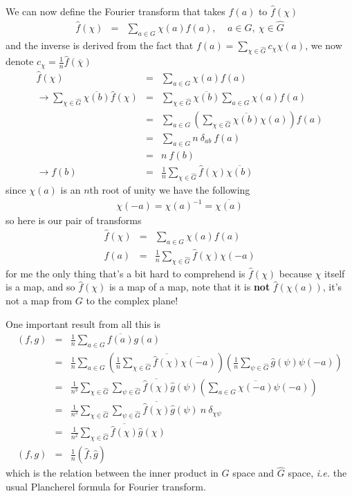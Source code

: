 \documentclass[aps,preprint,preprintnumbers,nofootinbib,showpacs,prd]{revtex4-1}
\newcommand{\ie}{{\it i.e.} }
\newcommand{\nbea}{\begin{eqnarray*}}
\newcommand{\neea}{\end{eqnarray*}}
\begin{document}
We can now define the Fourier transform that takes $f(a)$ to $\widehat f(\chi)$
%
\nbea
\widehat f (\chi) & = & \sum_{a\in G}\chi(a)f(a), ~~~~~ a\in G, ~ \chi\in \widehat G
\neea
%
and the inverse is derived from the fact that $f(a) = \sum_{\chi \in \widehat G} c_\chi \chi(a)$, we now denote $c_\chi = \frac{1}{n} \widehat f(\overline \chi)$
%
\nbea
\widehat f (\chi) & = & \sum_{a\in G}\chi(a)f(a) \\
\to \sum_{\chi \in \widehat G} \overline{\chi(b)} \widehat f (\chi)  & = & \sum_{\chi \in \widehat G} \overline{\chi(b)} \sum_{a\in G}\chi(a)f(a) \\
& = & \sum_{a\in G} \left (\sum_{\chi \in \widehat G} \overline{\chi(b)} \chi(a) \right ) f(a) \\
& = & \sum_{a\in G} n ~\delta_{ab}~ f(a) \\
& = & n~f(b) \\
\to f(b) & = & \frac{1}{n} \sum_{\chi \in \widehat G} \widehat f (\chi) \overline{\chi(b)}
\neea
%
since $\chi(a)$ is an $n$th root of unity we have the following
%
\nbea
\chi(-a) = \chi(a)^{-1} = \overline{\chi(a)}
\neea
%
so here is our pair of transforms
%
\nbea
\widehat f (\chi) & = & \sum_{a\in G}\chi(a)f(a) \\
f(a) & = & \frac{1}{n} \sum_{\chi \in \widehat G} \widehat f (\chi) {\chi(-a)}
\neea
%
for me the only thing that's a bit hard to comprehend is $\widehat f(\chi)$ because $\chi$ itself is a map, and so $\widehat f(\chi)$ is a map of a map, note that it is {\bf not} $\widehat f(\chi(a))$, it's not a map from $G$ to the complex plane!

One important result from all this is 
%
\nbea
(f,g) & = & \frac{1}{n} \sum_{a\in G} \overline{f(a)} g(a) \\
& = & \frac{1}{n} \sum_{a\in G} \left (\frac{1}{n} \sum_{\chi \in \widehat G} \overline{\widehat f (\chi)} \overline{\chi(-a)} \right ) \left ( \frac{1}{n} \sum_{\psi \in \widehat G} \widehat g (\psi) {\psi(-a)} \right ) \\
& = & \frac{1}{n^3} \sum_{\chi \in \widehat G} \sum_{\psi \in \widehat G} \overline{\widehat f (\chi)} \widehat g (\psi) \left (\sum_{a\in G} \overline{\chi(-a)} \psi(-a)\right ) \\
& = & \frac{1}{n^3} \sum_{\chi \in \widehat G} \sum_{\psi \in \widehat G} \overline{\widehat f (\chi)} \widehat g (\psi) ~n~\delta_{\chi\psi} \\
& = & \frac{1}{n^2} \sum_{\chi \in \widehat G} \overline{\widehat f (\chi)} \widehat g (\chi) \\
(f,g) & = & \frac{1}{n} \left ( \widehat f,\widehat g\right )
\neea
%
which is the relation between the inner product in $G$ space and $\widehat G$ space, \ie the usual Plancherel formula for Fourier transform.
\end{document}
